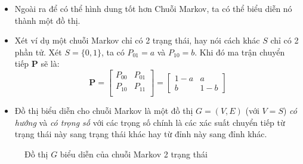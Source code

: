 \begin{itemize}
    \item Ngoài ra để có thể hình dung tốt hơn Chuỗi Markov, ta có thể biểu diễn nó thành một đồ thị.

    \item Xét ví dụ một chuỗi Markov chỉ có 2 trạng thái, hay nói cách khác $S$ chỉ có 2 phần tử. Xét $S = \{0, 1\}$, ta có $P_{01} = a$ và $P_{10} = b$. Khi đó ma trận chuyển tiếp $\mathbf{P}$ sẽ là:
    $$
    \mathbf{P} = \begin{bmatrix}
        P_{00} & P_{01} \\
        P_{10} & P_{11} \\
    \end{bmatrix} = \begin{bmatrix}
        1 - a &  a \\
        b & 1 - b
    \end{bmatrix}
    $$

    \item Đồ thị biểu diễn cho chuỗi Markov là một đồ thị $G = (V, E)$ (với $V = S$) \textit{có hướng} và \textit{có trọng số} với các trọng số chính là các xác suất chuyển tiếp từ trạng thái này sang trạng thái khác hay từ đỉnh này sang đỉnh khác.
\end{itemize}

\begin{figure}[H]
    \centering
    \caption{Đồ thị $G$ biểu diễn của chuỗi Markov 2 trạng thái}
    \label{fig:22graph}
\end{figure}
